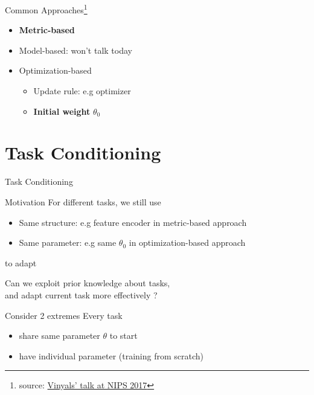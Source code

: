\documentclass{beamer}
\begin{document}
\begin{frame}{Common Approaches\footnote{source: \href{http://metalearning-symposium.ml/files/vinyals.pdf}{Vinyals' talk at NIPS 2017}}}
  \begin{itemize}
    \item \textbf{Metric-based}
    \item Model-based: won't talk today
    \item Optimization-based
      \begin{itemize}
        \item Update rule: e.g optimizer
      \item \textbf{Initial weight} $\theta_0$
      \end{itemize}
  \end{itemize}
\end{frame}

\section{Task Conditioning}
\begin{frame}
  \begin{center}
    \LARGE{Task Conditioning}
  \end{center}
\end{frame}

\begin{frame}{Motivation}
  For different tasks, we still use
  \begin{itemize}
    \item Same structure: e.g feature encoder in metric-based approach
    \item Same parameter: e.g same $\theta_0$ in optimization-based approach
  \end{itemize}
  to adapt

  \begin{center}
    Can we exploit prior knowledge about tasks,\\ and adapt current task more effectively ?
  \end{center}
\end{frame}

\begin{frame}{Consider 2 extremes}
  Every task
  \begin{itemize}
    \item share same parameter $\theta$ to start
    \item have individual parameter (training from scratch)
  \end{itemize}
\end{frame}
\end{document}
